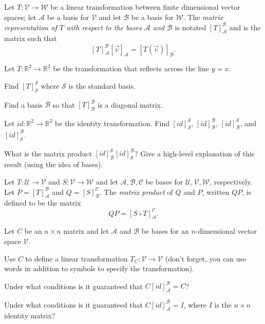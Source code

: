 \documentclass[14pt]{problemset}
\newcommand{\R}{\mathbb{R}}
\begin{document}
	\begin{definition}
		Let $T:\mathcal V\to\mathcal W$ be a linear transformation between finite dimensional vector spaces;
		let $\mathscr A$ be a basis for $\mathcal V$ and let $\mathscr B$ be a basis for $\mathcal W$. 
		The \emph{matrix representation of $T$ with respect to the bases $\mathscr A$ and $\mathscr B$}
		is notated $[T]_{\mathscr A}^{\mathscr B}$ and is the matrix such that
		\[
			[T]_{\mathscr A}^{\mathscr B}[\vec v]_{\mathscr A} = [T(\vec v)]_{\mathscr B}.
		\]
	\end{definition}

	\question
	Let $T:\R^2\to\R^2$ be the transformation that reflects across the line $y=x$.
	\begin{parts}
		\item Find $[T]_{\mathcal S}^{\mathcal S}$ where $\mathcal S$ is the standard basis.
		\item Find a basis $\mathcal B$ so that $[T]_{\mathcal B}^{\mathcal B}$ is a diagonal matrix.
		\item Let $id:\R^2\to\R^2$ be the identity transformation. Find $[id]_{\mathcal S}^{\mathcal S}$,
		$[id]_{\mathcal B}^{\mathcal B}$, $[id]_{\mathcal B}^{\mathcal S}$, and $[id]_{\mathcal S}^{\mathcal B}$.
		\item What is the matrix product $[id]_{\mathcal B}^{\mathcal S}[id]_{\mathcal S}^{\mathcal B}$? Give
			a high-level explanation of this result (using the idea of bases).
	\end{parts}

	\begin{definition}
		Let $T:\mathcal U\to\mathcal V$ and $S:\mathcal V\to\mathcal W$ and let $\mathscr A,\mathscr B,\mathscr C$
		be bases for $\mathcal U,\mathcal V,\mathcal W$, respectively. Let $P=[T]_{\mathscr A}^{\mathscr B}$ and
		$Q=[S]_{\mathscr B}^{\mathscr C}$. The \emph{matrix product} of $Q$ and $P$, written $QP$, is defined
		to be the matrix
		\[
			QP=[S\circ T]_{\mathscr A}^{\mathscr C}.
		\]
	\end{definition}

	\question
	Let $C$ be an $n\times n$ matrix and let $\mathscr A$ and $\mathscr B$ be bases for an $n$-dimensional vector
	space $\mathcal V$.
	\begin{parts}
	\item Use $C$ to define a linear transformation $T_C:\mathcal V\to\mathcal V$ (don't forget, you can use words
		in addition to symbols to specify the transformation).
		\item Under what conditions is it guaranteed that $C[id]_{\mathscr A}^{\mathscr B}=C$?
		\item Under what conditions is it guaranteed that $C[id]_{\mathscr A}^{\mathscr B}=I$, where $I$
			is the $n\times n$ identity matrix?
	\end{parts}
\end{document}
